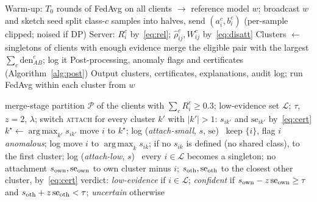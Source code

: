 \documentclass[pdflatex,sn-apa]{sn-jnl}
\theoremstyle{thmstyleone}
\theoremstyle{thmstylethree}
\newcommand{\rhohat}{\hat\rho}
\DeclareMathOperator*{\argmax}{arg\,max}
\begin{document}
\begin{algorithm}[t]
\caption{DisCo-CFL}\label{alg:disco}
\begin{algorithmic}[1]
\State Warm-up: $T_0$ rounds of FedAvg on all clients $\to$ reference model $w$; broadcast $w$ and sketch seed
 
  split class-$c$ samples into halves, send $(a_i^c,b_i^c)$ (per-sample clipped; noised if DP) \EndFor
\EndFor
\State Server: $R_i^c$ by~\eqref{eq:rel}; $\rhohat^c_{ij},W^c_{ij}$ by~\eqref{eq:disatt}
\State Clusters $\gets$ singletons of clients with enough evidence
 merge the eligible pair with the largest $\sum_c\mathrm{den}^c_{AB}$; log it \EndWhile
\State Post-processing, anomaly flags and certificates (Algorithm~\ref{alg:post})
\State Output clusters, certificates, explanations, audit log; run FedAvg within each cluster from $w$
\end{algorithmic}
\end{algorithm}

\begin{algorithm}[t]
\caption{Post-processing, anomaly handling and certificates}\label{alg:post}
\begin{algorithmic}[1]
\Require merge-stage partition $\mathcal P$ of the clients with $\sum_cR_i^c\ge0.3$; low-evidence set $\mathcal L$; $\tau$, $z=2$, $\lambda$; switch \textsc{attach}
  
  \State for every cluster $k'$ with $|k'|>1$: $s_{ik'}$ and $\mathrm{se}_{ik'}$ by~\eqref{eq:cert}
  \State $k^\star\gets\argmax_{k'}s_{ik'}$
   move $i$ to $k^\star$; log (\emph{attach-small}, $s$, $\mathrm{se}$)
  \Else\ keep $\{i\}$, flag $i$ \emph{anomalous}; log
  \EndIf
 \EndFor
  move $i$ to $\argmax_k s_{ik}$; if no $s_{ik}$ is defined (no shared class), to the first cluster; log (\emph{attach-low}, $s$) \EndFor
\Else\ every $i\in\mathcal L$ becomes a singleton; no attachment 
\EndIf
{} 
 \State $s_{\rm own},\mathrm{se}_{\rm own}$ to own cluster minus $i$; $s_{\rm oth},\mathrm{se}_{\rm oth}$ to the closest other cluster, by~\eqref{eq:cert}
 \State verdict: \emph{low-evidence} if $i\in\mathcal L$; \emph{confident} if $s_{\rm own}-z\,\mathrm{se}_{\rm own}\ge\tau$ and $s_{\rm oth}+z\,\mathrm{se}_{\rm oth}<\tau$; \emph{uncertain} otherwise
\EndFor
\end{algorithmic}
\end{algorithm}
\end{document}
